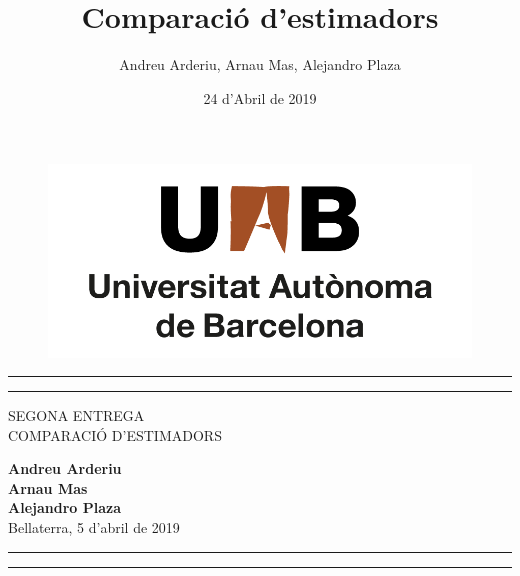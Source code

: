 \documentclass[12pt, catalan]{article}
\title{Comparació d'estimadors}
\author{Andreu Arderiu, Arnau Mas, Alejandro Plaza}
\date{24 d'Abril de 2019}
\numberwithin{table}{section}
\numberwithin{figure}{section}
\numberwithin{equation}{section}
\begin{document}
\begin{titlepage}
\begin{figure}[]
\centering
\includegraphics[scale=0.3]{uab.png}
\end{figure}

\centering %

\rule{\textwidth}{1.6pt}\vspace*{-\baselineskip}\vspace*{2pt} %
\rule{\textwidth}{0.4pt} %

\vspace{0.75\baselineskip} %
	
	{\LARGE SEGONA ENTREGA \vspace{0.3cm}\\ COMPARACIÓ D'ESTIMADORS\vspace{0.5cm}\\} %
	
    \textbf{Andreu Arderiu}\\
	\textbf{Arnau Mas}\\
	\textbf{Alejandro Plaza}\vspace{0.3cm}\\
	Bellaterra, 5 d'abril de 2019
	\vspace{0.75\baselineskip} %
	
\rule{\textwidth}{1.6pt}\vspace*{-\baselineskip}\vspace*{2pt} 
\vspace{1.3cm}
\rule{\textwidth}{0.4pt} %







\end{titlepage}
\end{document}
